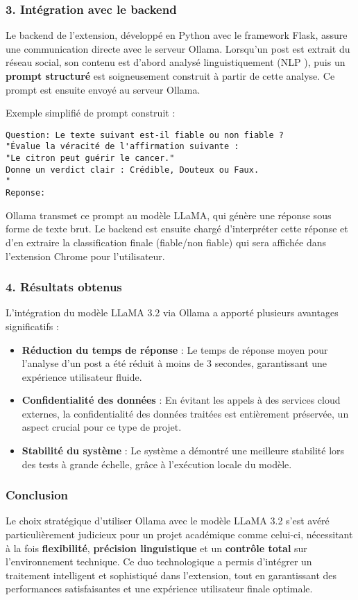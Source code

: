 \begin{description}
\subsubsection*{3. Intégration avec le backend}
Le backend de l'extension, développé en Python avec le framework Flask, assure une communication directe avec le serveur Ollama. Lorsqu'un post est extrait du réseau social, son contenu est d'abord analysé linguistiquement (NLP ), puis un \textbf{prompt structuré} est soigneusement construit à partir de cette analyse. Ce prompt est ensuite envoyé au serveur Ollama.

Exemple simplifié de prompt construit :
\begin{verbatim}
Question: Le texte suivant est-il fiable ou non fiable ? 
"Évalue la véracité de l'affirmation suivante :
"Le citron peut guérir le cancer."
Donne un verdict clair : Crédible, Douteux ou Faux.
"
Reponse:
\end{verbatim}
Ollama transmet ce prompt au modèle LLaMA, qui génère une réponse sous forme de texte brut. Le backend est ensuite chargé d'interpréter cette réponse et d'en extraire la classification finale (fiable/non fiable) qui sera affichée dans l'extension Chrome pour l'utilisateur.

\subsubsection*{4. Résultats obtenus}
L'intégration du modèle LLaMA 3.2 via Ollama a apporté plusieurs avantages significatifs :
\begin{itemize}
    \item \textbf{Réduction du temps de réponse} : Le temps de réponse moyen pour l'analyse d'un post a été réduit à moins de 3 secondes, garantissant une expérience utilisateur fluide.
    \item \textbf{Confidentialité des données} : En évitant les appels à des services cloud externes, la confidentialité des données traitées est entièrement préservée, un aspect crucial pour ce type de projet.
    \item \textbf{Stabilité du système} : Le système a démontré une meilleure stabilité lors des tests à grande échelle, grâce à l'exécution locale du modèle.
\end{itemize}
\subsubsection*{Conclusion}
Le choix stratégique d'utiliser Ollama avec le modèle LLaMA 3.2 s'est avéré particulièrement judicieux pour un projet académique comme celui-ci, nécessitant à la fois \textbf{flexibilité}, \textbf{précision linguistique} et un \textbf{contrôle total} sur l'environnement technique. Ce duo technologique a permis d'intégrer un traitement intelligent et sophistiqué dans l'extension, tout en garantissant des performances satisfaisantes et une expérience utilisateur finale optimale.




\end{description}
